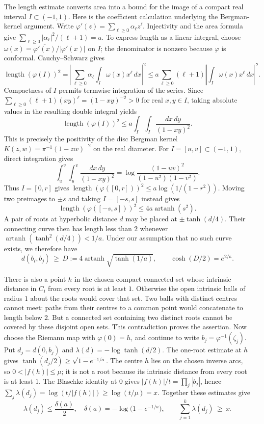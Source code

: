 \documentclass[11pt]{article}
\begin{document}
The length estimate converts area into a bound for the image of a compact real
interval $I\subset(-1,1)$. Here is the coefficient calculation underlying
the Bergman-kernel argument. Write
$\varphi'(z)=\sum_{\ell\ge0}\alpha_\ell z^\ell$. Injectivity and the
area formula give
$\sum_{\ell\ge0}|\alpha_\ell|^2/(\ell+1)=a$.
To express length as a linear integral, choose
$\omega(x)=\overline{\varphi'(x)}/|\varphi'(x)|$ on $I$; the denominator
is nonzero because $\varphi$ is conformal. Cauchy--Schwarz gives
\[
 \operatorname{length}(\varphi(I))^2
 =\left|\sum_{\ell\ge0}\alpha_\ell\int_I\omega(x)x^\ell\,dx\right|^2
 \le a\sum_{\ell\ge0}(\ell+1)
       \left|\int_I\omega(x)x^\ell\,dx\right|^2.
\]
Compactness of $I$ permits termwise integration of the series.
Since $\sum_{\ell\ge0}(\ell+1)(xy)^\ell=(1-xy)^{-2}>0$ for real
$x,y\in I$, taking absolute values in the resulting double integral yields
\[
 \operatorname{length}(\varphi(I))^2
 \le a\int_I\!\int_I\frac{dx\,dy}{(1-xy)^2}.
\]
This is precisely the positivity of the disc Bergman kernel
$K(z,w)=\pi^{-1}(1-z\overline w)^{-2}$ on the real diameter.
For $I=[u,v]\subset(-1,1)$, direct integration gives
\[
 \int_u^v\!\int_u^v\frac{dx\,dy}{(1-xy)^2}
 =\log\frac{(1-uv)^2}{(1-u^2)(1-v^2)}.
\]
Thus $I=[0,r]$ gives
$\operatorname{length}(\varphi([0,r]))^2\le a\log(1/(1-r^2))$.
Moving two preimages to $\pm s$ and taking $I=[-s,s]$ instead gives
\[
 \operatorname{length}(\varphi([-s,s]))^2\le4a\operatorname{artanh}(s^2).
\]
A pair of roots at hyperbolic distance $d$ may be placed at $\pm\tanh(d/4)$.
Their connecting curve then has length less than $2$ whenever
$\operatorname{artanh}(\tanh^2(d/4))<1/a$. Under our assumption that no
such curve exists, we therefore have
\begin{equation}\label{eq:lc-separation}
 d(b_i,b_j)\ \ge\ D:=4\operatorname{artanh}\sqrt{\tanh(1/a)},
 \qquad \cosh(D/2)=e^{2/a}.
\end{equation}

There is also a point $h$ in the chosen compact connected set whose
intrinsic distance in $C_t$ from every root is at least $1$.
Otherwise the open intrinsic balls of radius $1$ about the roots would
cover that set. Two balls with distinct centres cannot meet: paths from
their centres to a common point would concatenate to length below $2$.
But a connected set containing two distinct roots cannot be covered by
these disjoint open sets. This contradiction proves the assertion.
Now choose the Riemann map with $\varphi(0)=h$, and continue to write
$b_j=\varphi^{-1}(\zeta_j)$. Put $d_j=d(0,b_j)$ and
$\lambda(d)=-\log\tanh(d/2)$.  The one-root estimate at $h$
gives $\tanh(d_j/2)\ge\sqrt{1-e^{-1/a}}$. The centre $h$ lies on the
chosen inverse arcs, so $0<|f(h)|\le\mu$; it is not a root because its
intrinsic distance from every root is at least $1$. The Blaschke identity
at $0$ gives $|f(h)|/t=\prod_j|b_j|$, hence
$\sum_j\lambda(d_j)=\log(t/|f(h)|)\ge\log(t/\mu)=x$.
Together these estimates give
\begin{equation}\label{eq:lc-radius-and-budget}
 \lambda(d_j)\le\frac{\delta(a)}2,\quad
 \delta(a)=-\log\bigl(1-e^{-1/a}\bigr),
 \qquad
 \sum_{j=1}^{k}\lambda(d_j)\ \ge\ x .
\end{equation}
\end{document}
